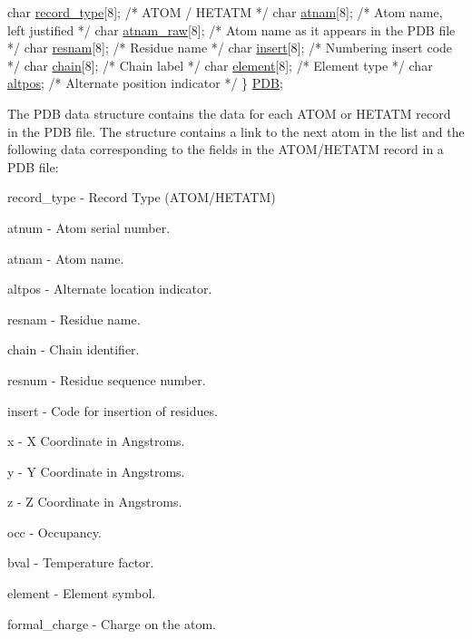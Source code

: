 \begin{DoxyCode}
   \textcolor{keywordtype}{char} \hyperlink{structpdb__entry_ac3b9b5be75a753a35e50eaf08be8e77e}{record\_type}[8];      \textcolor{comment}{/* ATOM / HETATM                           */}
   \textcolor{keywordtype}{char} \hyperlink{structpdb__entry_a0982e141e36a2d4299d6555e0a1496cb}{atnam}[8];            \textcolor{comment}{/* Atom name, left justified               */}
   \textcolor{keywordtype}{char} \hyperlink{structpdb__entry_a2dd38672a2991bc568e105a24b3c936b}{atnam\_raw}[8];        \textcolor{comment}{/* Atom name as it appears in the PDB file */}
   \textcolor{keywordtype}{char} \hyperlink{structpdb__entry_a6f47476bfe0dd0abc0ade4a21127dfc2}{resnam}[8];           \textcolor{comment}{/* Residue name                            */}
   \textcolor{keywordtype}{char} \hyperlink{structpdb__entry_a8cc72faf0908e6fff29637c614e608ed}{insert}[8];           \textcolor{comment}{/* Numbering insert code                   */}
   \textcolor{keywordtype}{char} \hyperlink{structpdb__entry_abe96afafc1017db40e25d4183a058bc5}{chain}[8];            \textcolor{comment}{/* Chain label                             */}
   \textcolor{keywordtype}{char} \hyperlink{structpdb__entry_a780be116469a48c4b1d531bafb335f99}{element}[8];          \textcolor{comment}{/* Element type                            */}
   \textcolor{keywordtype}{char} \hyperlink{structpdb__entry_aac30c1bea908a7bb889d5e09d60279e8}{altpos};              \textcolor{comment}{/* Alternate position indicator            */}
\}  \hyperlink{pdb_8h_aa31eb9fe57a50b29778e64bb131b22bf}{PDB};
\end{DoxyCode}


The P\-D\-B data structure contains the data for each A\-T\-O\-M or H\-E\-T\-A\-T\-M record in the P\-D\-B file. The structure contains a link to the next atom in the list and the following data corresponding to the fields in the A\-T\-O\-M/\-H\-E\-T\-A\-T\-M record in a P\-D\-B file\-:


\begin{DoxyItemize}
\item record\-\_\-type -\/ Record Type (A\-T\-O\-M/\-H\-E\-T\-A\-T\-M)
\item atnum -\/ Atom serial number.
\item atnam -\/ Atom name.
\item altpos -\/ Alternate location indicator.
\item resnam -\/ Residue name.
\item chain -\/ Chain identifier.
\item resnum -\/ Residue sequence number.
\item insert -\/ Code for insertion of residues.
\item x -\/ X Coordinate in Angstroms.
\item y -\/ Y Coordinate in Angstroms.
\item z -\/ Z Coordinate in Angstroms.
\item occ -\/ Occupancy.
\item bval -\/ Temperature factor.
\item element -\/ Element symbol.
\item formal\-\_\-charge -\/ Charge on the atom.
\end{DoxyItemize}

